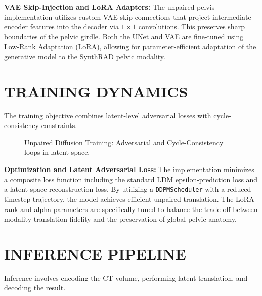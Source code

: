 \documentclass[10pt,a4paper]{article}
\begin{document}
\textbf{VAE Skip-Injection and LoRA Adapters:} 
The unpaired pelvis implementation utilizes custom VAE skip connections that project intermediate encoder features into the decoder via $1 \times 1$ convolutions. This preserves sharp boundaries of the pelvic girdle. Both the UNet and VAE are fine-tuned using Low-Rank Adaptation (LoRA), allowing for parameter-efficient adaptation of the generative model to the SynthRAD pelvic modality.

\section{TRAINING DYNAMICS}
The training objective combines latent-level adversarial losses with cycle-consistency constraints.

\begin{figure}[H]
\centering
{}
\caption{Unpaired Diffusion Training: Adversarial and Cycle-Consistency loops in latent space.}
\end{figure}

\textbf{Optimization and Latent Adversarial Loss:} 
The implementation minimizes a composite loss function including the standard LDM epsilon-prediction loss and a latent-space reconstruction loss. By utilizing a \texttt{DDPMScheduler} with a reduced timestep trajectory, the model achieves efficient unpaired translation. The LoRA rank and alpha parameters are specifically tuned to balance the trade-off between modality translation fidelity and the preservation of global pelvic anatomy.

\section{INFERENCE PIPELINE}
Inference involves encoding the CT volume, performing latent translation, and decoding the result.
\end{document}
